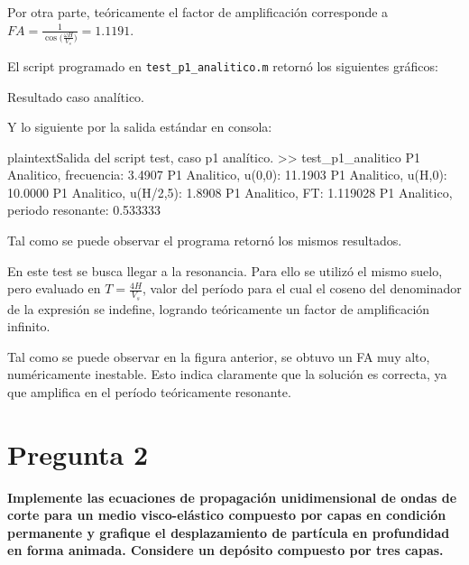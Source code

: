 Por otra parte, teóricamente el factor de amplificación corresponde a $FA=\frac{1}{\cos\bigg(\frac{\omega H}{V_s}\bigg)} = 1.1191$.

El script programado en \texttt{test\_p1\_analitico.m} retornó los siguientes gráficos:

\begin{images}{Resultado caso analítico.}
\end{images}

Y lo siguiente por la salida estándar en consola:

\begin{sourcecode}{plaintext}{Salida del script test, caso p1 analítico.}
>> test_p1_analitico
P1 Analitico, frecuencia: 3.4907
P1 Analitico, u(0,0): 11.1903
P1 Analitico, u(H,0): 10.0000
P1 Analitico, u(H/2,5): 1.8908
P1 Analitico, FT: 1.119028
P1 Analitico, periodo resonante: 0.533333
\end{sourcecode}

Tal como se puede observar el programa retornó los mismos resultados.

\clearpage
{}

En este test se busca llegar a la resonancia. Para ello se utilizó el mismo suelo, pero evaluado en $T=\frac{4H}{V_s}$, valor del período para el cual el coseno del denominador de la expresión se indefine, logrando teóricamente un factor de amplificación infinito.


Tal como se puede observar en la figura anterior, se obtuvo un FA muy alto, numéricamente inestable. Esto indica claramente que la solución es correcta, ya que amplifica en el período teóricamente resonante.

\clearpage
\section{Pregunta 2}

\textbf{Implemente las ecuaciones de propagación unidimensional de ondas de corte para un medio visco-elástico compuesto por capas en condición permanente y grafique el desplazamiento de partícula en profundidad en forma animada. Considere un depósito compuesto por tres capas.} \\


